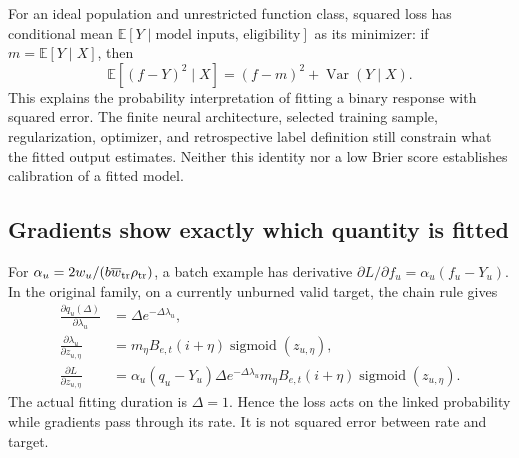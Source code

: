\documentclass[11pt,a4paper]{article}
\newcommand{\E}{\mathbb{E}}
\begin{document}
For an ideal population and unrestricted function class, squared loss has
conditional mean $\E[Y\mid\text{model inputs, eligibility}]$ as its minimizer:
if $m=\E[Y\mid X]$, then
\begin{equation}
 \E[(f-Y)^2\mid X]=(f-m)^2+\operatorname{Var}(Y\mid X).
\end{equation}
This explains the probability interpretation of fitting a binary response
with squared error. The finite neural architecture, selected training sample,
regularization, optimizer, and retrospective label definition still constrain
what the fitted output estimates. Neither this identity nor a low Brier score
establishes calibration of a fitted model.

\subsection{Gradients show exactly which quantity is fitted}

For $\alpha_u=2w_u/(b\overline w_{\rm tr}\rho_{\mathrm{tr}})$, a batch example
has derivative $\partial L/\partial f_u=\alpha_u(f_u-Y_u)$. In the original
family, on a currently unburned valid target, the chain rule gives
\begin{align}
 \frac{\partial q_u(\Delta)}{\partial\lambda_u}
   &=\Delta e^{-\Delta\lambda_u},\\
 \frac{\partial\lambda_u}{\partial z_{u,\eta}}
   &=m_\eta B_{e,t}(i+\eta)\operatorname{sigmoid}(z_{u,\eta}),\\
 \frac{\partial L}{\partial z_{u,\eta}}
   &=\alpha_u(q_u-Y_u)\Delta e^{-\Delta\lambda_u}
      m_\eta B_{e,t}(i+\eta)\operatorname{sigmoid}(z_{u,\eta}).
 \label{eq:prob-original-gradient}
\end{align}
The actual fitting duration is $\Delta=1$. Hence the loss acts on the linked
probability while gradients pass through its rate. It is not squared error
between rate and target.
\end{document}
